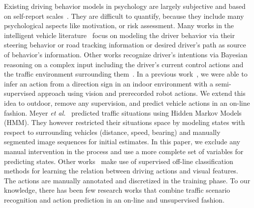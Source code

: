 Existing driving behavior models in psychology are largely subjective and based
on self-report scales~\cite{ranney94models}. They are difficult to quantify,
because they include many psychological aspects like motivation, or risk
assessment. Many works in the intelligent vehicle
literature~\cite{donges78two,mcruer80human,hess90control,macadam81application}
focus on modeling the driver behavior via their steering behavior or road
tracking information or desired driver's path as source of behavior's
information. Other works recognize driver's intentions via Bayesian reasoning on
a complex input including the driver's current control actions and the traffic
environment surrounding them~\cite{oliver00graphical,liu01modeling}. In a
previous work~\cite{maye10inferring}, we were able to infer an action from a
direction sign in an indoor environment with a semi-supervised approach using
vision and prerecorded robot actions. We extend this idea to outdoor, remove any
supervision, and predict vehicle actions in an on-line fashion. Meyer
\emph{et al.}~\cite{meyer09probabilistic} predicted traffic situations using
Hidden Markov Models (HMM). They however restricted their situations space by
modeling states with respect to surrounding vehicles (distance, speed, bearing)
and manually segmented image sequences for initial estimates. In this paper, we
exclude any manual intervention in the process and use a more complete set of
variables for predicting states. Other
works~\cite{heracles10vision,pugeault10learning} make use of supervised off-line
classification methods for learning the relation between driving actions and 
visual features. The actions are manually annotated and discretized in the
training phase. To our knowledge, there has been few research works that combine
traffic scenario recognition and action prediction in an on-line and
unsupervised fashion.

